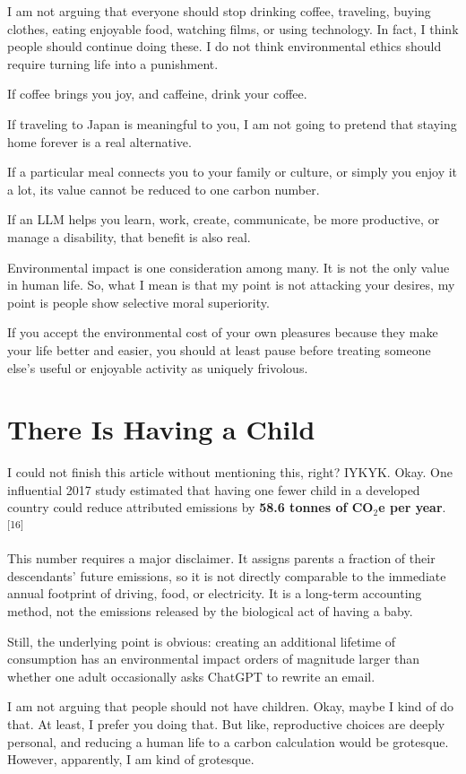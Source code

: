 \documentclass{article}
\begin{document}
I am not arguing that everyone should stop drinking coffee, traveling, buying clothes, eating enjoyable food, watching films, or using technology. In fact, I think people should continue doing these. I do not think environmental ethics should require turning life into a punishment.

If coffee brings you joy, and caffeine, drink your coffee.

If traveling to Japan is meaningful to you, I am not going to pretend that staying home forever is a real alternative.

If a particular meal connects you to your family or culture, or simply you enjoy it a lot, its value cannot be reduced to one carbon number.

If an LLM helps you learn, work, create, communicate, be more productive, or manage a disability, that benefit is also real.

Environmental impact is one consideration among many. It is not the only value in human life. So, what I mean is that my point is not attacking your desires, my point is people show selective moral superiority.

If you accept the environmental cost of your own pleasures because they make your life better and easier, you should at least pause before treating someone else's useful or enjoyable activity as uniquely frivolous.

\section*{There Is Having a Child}

I could not finish this article without mentioning this, right? IYKYK. Okay. One influential 2017 study estimated that having one fewer child in a developed country could reduce attributed emissions by \textbf{58.6 tonnes of CO$_2$e per year}.\textsuperscript{[16]}

This number requires a major disclaimer. It assigns parents a fraction of their descendants' future emissions, so it is not directly comparable to the immediate annual footprint of driving, food, or electricity. It is a long-term accounting method, not the emissions released by the biological act of having a baby.

Still, the underlying point is obvious: creating an additional lifetime of consumption has an environmental impact orders of magnitude larger than whether one adult occasionally asks ChatGPT to rewrite an email.

I am not arguing that people should not have children. Okay, maybe I kind of do that. At least, I prefer you doing that. But like, reproductive choices are deeply personal, and reducing a human life to a carbon calculation would be grotesque. However, apparently, I am kind of grotesque.
\end{document}
